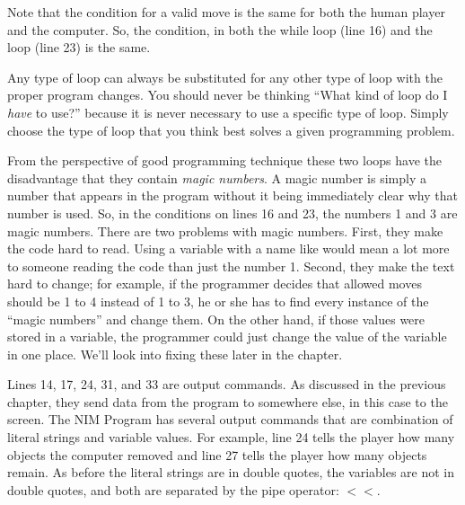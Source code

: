 Note that the condition for a valid move is the same for both the human player and the computer.  So, the condition, in both the while loop (line 16) and the  loop (line 23) is the same.

Any type of loop can always be substituted for any other type of loop with the proper program changes.  You should never be thinking ``What kind of loop do I \emph{have} to use?'' because it is never necessary to use a specific type of loop.  Simply choose the type of loop that you think best solves a given programming problem.



From the perspective of good programming technique these two loops have the disadvantage that they contain \emph{magic numbers}.  A magic number is simply a number that appears in the program without it being immediately clear why that number is used.  So, in the conditions on lines 16 and 23, the numbers 1 and 3 are magic numbers.  There are two problems with magic numbers.  First, they make the code hard to read.  Using a variable with a name like  would mean a lot more to someone reading the code than just the number 1.  Second, they make the text hard to change; for example, if the programmer decides that allowed moves should be 1 to 4 instead of 1 to 3, he or she has to find every instance of the ``magic numbers'' and change them.  On the other hand, if those values were stored in a variable, the programmer could just change the value of the variable in one place.  We'll look into fixing these later in the chapter.

Lines 14, 17, 24, 31, and 33 are output commands.  As discussed in the previous chapter, they send data from the program to somewhere else, in this case to the screen.  The NIM Program has several output commands that are combination of literal strings and variable values.  
For example, line 24 tells the player how many objects the computer removed and line 27 tells the player how many objects remain.  As before the literal strings are in double quotes, the variables are not in double quotes, and both are separated by the pipe operator: $<<$.

